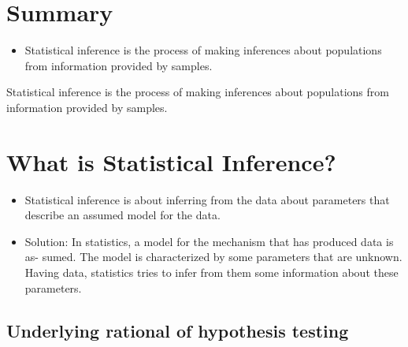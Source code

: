 \documentclass[]{report}
\begin{document}
\section{Summary}
\begin{itemize}
\item 
Statistical inference is the process of making inferences about populations from information provided by samples.
\end{itemize}







Statistical inference is the process of making inferences about populations from information provided by samples.

\section{What is Statistical Inference?}

\begin{itemize}
\item Statistical inference is about inferring from the data about parameters that describe an assumed
model for the data.
\item 
Solution: In statistics, a model for the mechanism that has produced data is as-
sumed. The model is characterized by some parameters that are unknown. Having
data, statistics tries to infer from them some information about these parameters.
\end{itemize}











\subsection{Underlying rational of hypothesis testing}
\end{document}

